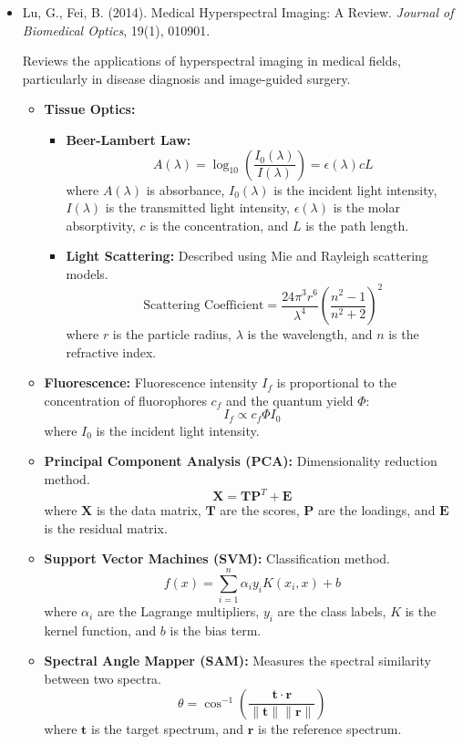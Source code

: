 \documentclass[10pt,svgnames,fragile]{beamer}
\begin{document}
\begin{frame}
\tiny
\begin{itemize}

    \item Lu, G., Fei, B. (2014). Medical Hyperspectral Imaging: A Review. \textit{Journal of Biomedical Optics}, 19(1), 010901. \href{https://www.spiedigitallibrary.org/journals/journal-of-biomedical-optics/volume-19/issue-01/010901/Medical-hyperspectral-imaging-a-review/10.1117/1.JBO.19.1.010901.full}{\color{blue}{DOI: 10.1117/1.JBO.19.1.010901}} \cite{luMedicalHyperspectralImaging2014}
    
    {\color{gray}Reviews the applications of hyperspectral imaging in medical fields, particularly in disease diagnosis and image-guided surgery.}
    \begin{itemize} \tiny
    \item \textbf{Tissue Optics:}
    \begin{itemize} \tiny
        \item \textbf{Beer-Lambert Law:}
        \[
        A(\lambda) = \log_{10}\left(\frac{I_0(\lambda)}{I(\lambda)}\right) = \epsilon(\lambda) c L
        \]
        where \(A(\lambda)\) is absorbance, \(I_0(\lambda)\) is the incident light intensity, \(I(\lambda)\) is the transmitted light intensity, \(\epsilon(\lambda)\) is the molar absorptivity, \(c\) is the concentration, and \(L\) is the path length.
        \item \textbf{Light Scattering:} Described using Mie and Rayleigh scattering models.
        \[
        \text{Scattering Coefficient} = \frac{24\pi^3 r^6}{\lambda^4} \left(\frac{n^2-1}{n^2+2}\right)^2
        \]
        where \(r\) is the particle radius, \(\lambda\) is the wavelength, and \(n\) is the refractive index.
    \end{itemize}
    \item \textbf{Fluorescence:} Fluorescence intensity \(I_f\) is proportional to the concentration of fluorophores \(c_f\) and the quantum yield \(\Phi\):
    \[
    I_f \propto c_f \Phi I_0
    \]
    where \(I_0\) is the incident light intensity.
    \item \textbf{Principal Component Analysis (PCA):} Dimensionality reduction method.
    \[
    \mathbf{X} = \mathbf{TP}^T + \mathbf{E}
    \]
    where \(\mathbf{X}\) is the data matrix, \(\mathbf{T}\) are the scores, \(\mathbf{P}\) are the loadings, and \(\mathbf{E}\) is the residual matrix.
    \item \textbf{Support Vector Machines (SVM):} Classification method.
    \[
    f(x) = \sum_{i=1}^{n} \alpha_i y_i K(x_i, x) + b
    \]
    where \(\alpha_i\) are the Lagrange multipliers, \(y_i\) are the class labels, \(K\) is the kernel function, and \(b\) is the bias term.
    \item \textbf{Spectral Angle Mapper (SAM):} Measures the spectral similarity between two spectra.
    \[
    \theta = \cos^{-1} \left(\frac{\mathbf{t} \cdot \mathbf{r}}{\|\mathbf{t}\| \|\mathbf{r}\|}\right)
    \]
    where \(\mathbf{t}\) is the target spectrum, and \(\mathbf{r}\) is the reference spectrum.
    \end{itemize}

\end{itemize}
\end{frame}
\end{document}
